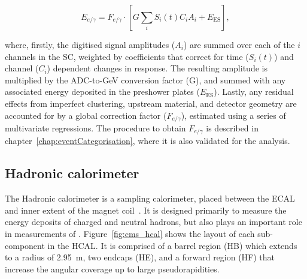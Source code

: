 \begin{equation}
\label{eqn:egamma_reco_energy}
    E_{e/\gamma} = F_{e/\gamma} \cdot \left[ G\sum_{i}S_{i}(t)C_{i}A_{i}  + E_{\mathrm{ES}}\right],
\end{equation}

\noindent where, firstly, the digitised signal amplitudes ($A_{i}$) are summed over each of the $i$ channels in the SC, weighted by coefficients that correct for time ($S_{i}(t)$) and channel ($C_{i}$) dependent changes in response. The resulting amplitude is multiplied by the ADC-to-GeV conversion factor (G), and summed with any associated energy deposited in the preshower plates ($E_{\mathrm{ES}}$). Lastly, any residual effects from imperfect clustering, upstream material, and detector geometry are accounted for by a global correction factor ($F_{e/\gamma}$), estimated using a series of multivariate regressions. The procedure to obtain $F_{e/\gamma}$ is described in chapter~\ref{chap:eventCategorisation}, where it is also validated for the \Hee analysis.

\subsection{Hadronic calorimeter}

The Hadronic calorimeter is a sampling calorimeter, placed between the ECAL and inner extent of the magnet coil~\cite{CMS,HCAL}. It is designed primarily to measure the energy deposits of charged and neutral hadrons, but also plays an important role in measurements of \met. Figure~\ref{fig:cms_hcal} shows the layout of each sub-component in the HCAL. It is comprised of a barrel region (HB) which extends to a radius of 2.95~m, two endcaps (HE), and a forward region (HF) that increase the angular coverage up to large pseudorapidities.  

